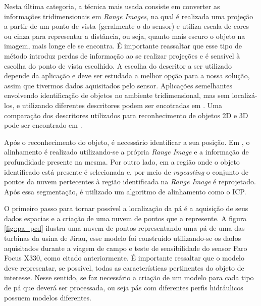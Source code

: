Nesta última categoria, a técnica
mais usada consiste em converter as informações tridimensionais em \textit{Range
Images}, na qual é realizada uma projeção a partir de um ponto de vista (geralmente o do sensor) e utiliza escala
de cores ou cinza para representar a distância, ou seja, quanto mais escuro o
objeto na imagem, mais longe ele se encontra. É importante reassaltar que esse
tipo de método introduz perdas de informação ao se realizar projeções e é
sensível à escolha do ponto de vista escolhido. 
A escolha do descritor a ser
utilizado depende da aplicação e deve ser estudada a melhor opção para a nossa
solução, assim que tivermos dados aquisitados pelo sensor. Aplicações
semelhantes envolvendo identificação de objetos no ambiente tridimensional, mas
sem localizá-los, e utilizando diferentes descritores podem ser encotradas em
\cite{Bayramoglu2010,Hetzel2001,Chen2007}. Uma comparação dos descritores
utilizados para reconhecimento de objetos 2D e 3D pode ser encontrado em \cite{Zaharia2004, Weber2014}.

Após o reconhecimento do objeto, é necessário identificar a sua posição.
Em \cite{Steder2009}, o alinhamento é realizado utilizando-se a própria
\textit{Range Image} e a informação de profundidade presente na mesma. Por outro
lado, em \cite{Nuchter2005} a região onde o objeto identificado está presente é
selecionada e, por meio de \textit{raycasting} o conjunto de pontos da nuvem
pertecentes à região identificada na \textit{Range Image} é reprojetado. Após
essa segmentação, é utilizado um algoritmo de alinhamento como o ICP.

O primeiro passo para tornar possível a localização da pá é a aquisição de seus
dados espacias e a criação de uma nuvem de pontos que a represente. A
figura \ref{fig::pa_pcd} ilustra uma nuvem de pontos representando uma pá de uma das
turbinas da usina de Jirau, esse modelo foi construído utilizando-se os dados
aquisitados durante a viagem de campo e teste de sensibilidade do sensor Faro
Focus X330, como citado anteriormente. É importante ressaltar que o
modelo deve representar, se possível, todas as características pertinentes do objeto de interesse. Nesse
sentido, se faz necessário a criação de um modelo para cada tipo de pá que
deverá ser processada, ou seja pás com diferentes perfis hidráulicos possuem
modelos diferentes.


